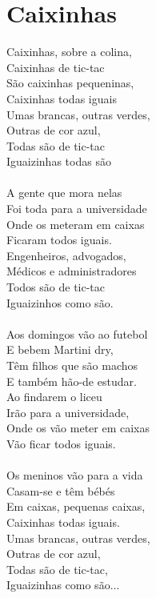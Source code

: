 \documentclass{article}
\begin{document}
\section{ Caixinhas}
Caixinhas,  sobre a colina,\\
Caixinhas de tic-tac\\
São caixinhas pequeninas,\\
Caixinhas todas iguais\\
Umas brancas, outras verdes,\\
Outras de cor azul,\\
Todas são de tic-tac\\
Iguaizinhas todas são\\
\\
A gente que mora nelas\\
Foi toda para a universidade\\
Onde os meteram em caixas\\
Ficaram todos iguais.\\
Engenheiros, advogados,\\
Médicos e administradores\\
Todos são de tic-tac\\
Iguaizinhos como são.\\
\\
Aos domingos vão ao futebol\\
E bebem Martini dry,\\
Têm filhos que são machos\\
E também hão-de estudar.\\
Ao findarem o liceu\\
Irão para a universidade,\\
Onde os vão meter em caixas\\
Vão ficar todos iguais.\\
\\
Os meninos vão para a vida\\
Casam-se e têm bébés\\
Em caixas, pequenas caixas,\\
Caixinhas todas iguais.\\
Umas brancas, outras verdes,\\
Outras de cor azul,\\
Todas são de tic-tac,\\
Iguaizinhas como são...\\
\end{document}

